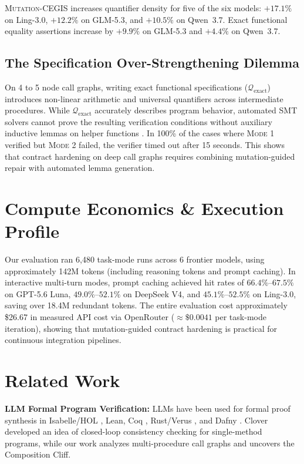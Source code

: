 \documentclass{article}
\begin{document}
\textsc{Mutation-CEGIS} increases quantifier density for five of the six models: $+17.1\%$ on Ling-3.0, $+12.2\%$ on GLM-5.3, and $+10.5\%$ on Qwen~3.7. Exact functional equality assertions increase by $+9.9\%$ on GLM-5.3 and $+4.4\%$ on Qwen~3.7.

\subsection{The Specification Over-Strengthening Dilemma}
\label{sec:overstrengthening}

On 4 to 5 node call graphs, writing exact functional specifications ($\mathcal{Q}_{\text{exact}}$) introduces non-linear arithmetic and universal quantifiers across intermediate procedures. While $\mathcal{Q}_{\text{exact}}$ accurately describes program behavior, automated SMT solvers cannot prove the resulting verification conditions without auxiliary inductive lemmas on helper functions \citep{yang2025autoverus, first2023baldur}. In 100\% of the cases where \textsc{Mode 1} verified but \textsc{Mode 2} failed, the verifier timed out after 15 seconds. This shows that contract hardening on deep call graphs requires combining mutation-guided repair with automated lemma generation.

\section{Compute Economics \& Execution Profile}
\label{sec:economics}

Our evaluation ran 6,480 task-mode runs across 6 frontier models, using approximately 142M tokens (including reasoning tokens and prompt caching). In interactive multi-turn modes, prompt caching achieved hit rates of $66.4\%\text{--}67.5\%$ on GPT-5.6 Luna, $49.0\%\text{--}52.1\%$ on DeepSeek V4, and $45.1\%\text{--}52.5\%$ on Ling-3.0, saving over 18.4M redundant tokens. The entire evaluation cost approximately \$26.67 in measured API cost via OpenRouter ($\approx \$0.0041$ per task-mode iteration), showing that mutation-guided contract hardening is practical for continuous integration pipelines.

\section{Related Work}
\label{sec:related}

\textbf{LLM Formal Program Verification:} LLMs have been used for formal proof synthesis in Isabelle/HOL \citep{wu2022autoformalization}, Lean, Coq \citep{first2023baldur}, Rust/Verus \citep{yang2025autoverus}, and Dafny \citep{sun2024clover, austin2021program, le2022coderl}. Clover \citep{sun2024clover} developed an idea of closed-loop consistency checking for single-method programs, while our work analyzes multi-procedure call graphs and uncovers the Composition Cliff.
\end{document}
